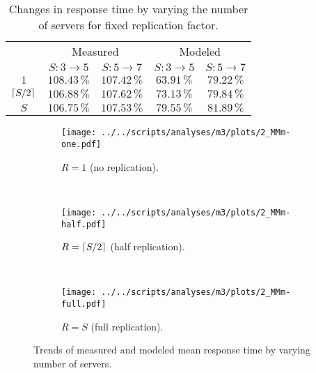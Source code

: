 \documentclass[11pt]{article}
\newcommand\task[1]{{\color[HTML]{999999}\subsection{Task}#1}}
\renewcommand\task[1]{}
\DeclarePairedDelimiter{\ceil}{\lceil}{\rceil}
\theoremstyle{definition}
\begin{document}
\begin{table}[h]
\centering
\small
{
    \begin{tabular}{|c||c|c||c|c|}
        \hline
        \rowcolor{Gray} & \multicolumn{2}{c||}{Measured} & \multicolumn{2}{c|}{Modeled} \\
        \hhline{|~||-|-||-|-|}
        \rowcolor{Gray} \multirow{-2}{*}{$R$}& $S:3\to5$ & $S:5\to7$ & $S:3\to5$ & $S:5\to7$  \\
        \hline
        $1$ & $108.43\,\%$ & $107.42\,\%$ & $63.91\,\%$ & $79.22\,\%$ \\
        $\ceil{S/2}$ & $106.88\,\%$ & $107.62\,\%$ & $73.13\,\%$ & $79.84\,\%$ \\
        $S$ & $106.75\,\%$ & $107.53\,\%$ & $79.55\,\%$ & $81.89\,\%$ \\
        \hline
    \end{tabular}
}
\caption{Changes in response time by varying the number of servers for fixed replication factor.}
\label{tab:2_nos_trend}
\end{table}

\begin{figure}[!h]
    \newcommand\wdt{10cm}
    \centering
    \begin{subfigure}[t]{\wdt}
        \centering
        \texttt{[image: ../../scripts/analyses/m3/plots/2\_MMm-one.pdf]}
        \caption{$R=1$ (no replication).}\label{fig:2_MMm-one}
    \end{subfigure}
    \\\vspace{3mm}
    \begin{subfigure}[t]{\wdt}
        \centering
        \texttt{[image: ../../scripts/analyses/m3/plots/2\_MMm-half.pdf]}
        \caption{$R=\ceil{S/2}$ (half replication).}\label{fig:2_MMm-half}
    \end{subfigure}
    \\\vspace{3mm}
    \begin{subfigure}[t]{\wdt}
        \centering
        \texttt{[image: ../../scripts/analyses/m3/plots/2\_MMm-full.pdf]}
        \caption{$R=S$ (full replication).}\label{fig:2_MMm-full}
    \end{subfigure}
    \caption{Trends of measured and modeled mean response time by varying number of servers.}
    \label{fig:2_MMm-nos}
\end{figure}

\task{
Length: 1-4 pages

Starting from the different configurations that you used in the second milestone, build M/M/m queuing models of the system as a whole. Detail the characteristics of these series of models and compare them with experimental data. The goal is the analysis of the model and the real scalability of the system (explain the similarities, the differences, and map them to aspects of the design or the experiments). Make sure to follow the model-related guidelines described in the Notes!}
\end{document}
